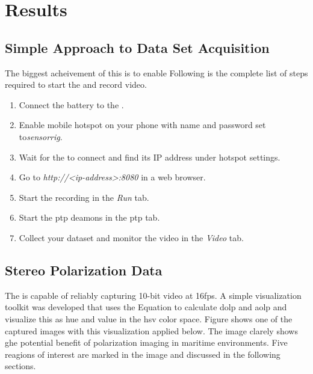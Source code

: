 \chapter{Results}
\label{chap:results}

\section{Simple Approach to Data Set Acquisition}
The biggest acheivement of this \master is to enable
Following is the complete list of steps required to start the \sr and record video.
\begin{enumerate}
    \item Connect the battery to the \jx.
    \item Enable mobile hotspot on your phone with name and password set to\textit{sensorrig}.
    \item Wait for the \sr to connect and find its IP address under hotspot settings.
    \item Go to \textit{http://<ip-address>:8080} in a web browser.
    \item Start the recording in the \textit{Run} tab.
    \item Start the \gls{ptp} deamons in the \gls{ptp} tab.
    \item Collect your dataset and monitor the video in the \textit{Video} tab.
\end{enumerate}


\section{Stereo Polarization Data}
The \sr is capable of reliably capturing 10-bit video at 16fps.
A simple visualization toolkit was developed that uses the Equation \todo
to calculate \gls{dolp} and \gls{aolp} and visualize this as hue and value in the \gls{hsv} color space.
Figure shows one of the captured images with this visualization applied below.
The image clarely shows ghe potential benefit of polarization imaging in maritime environments.
Five reagions of interest are marked in the image and discussed in the following sections.

